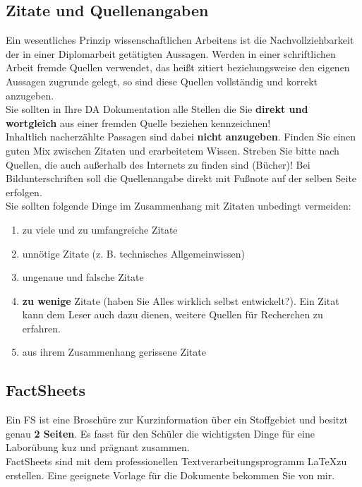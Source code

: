 \documentclass[a4paper, 12pt, xcolor=dvipsnames]{scrartcl}		%
\begin{document}
\subsection{Zitate und Quellenangaben}
Ein wesentliches Prinzip wissenschaftlichen Arbeitens ist die Nachvollziehbarkeit der in einer Diplomarbeit  getätigten Aussagen. Werden in einer schriftlichen Arbeit fremde Quellen verwendet, das heißt
zitiert beziehungsweise den eigenen Aussagen zugrunde gelegt, so sind diese Quellen vollständig und korrekt anzugeben.\\
Sie sollten in Ihre DA Dokumentation alle Stellen die Sie \textbf{direkt und wortgleich} aus einer fremden Quelle beziehen kennzeichnen!\\
Inhaltlich nacherzählte Passagen sind dabei \textbf{nicht anzugeben}. Finden Sie einen guten Mix zwischen Zitaten und erarbeitetem Wissen. Streben Sie bitte nach Quellen, die auch außerhalb des Internets zu finden sind (Bücher)!
Bei Bildunterschriften soll die Quellenangabe direkt mit Fußnote auf der selben Seite erfolgen.\\

Sie sollten folgende Dinge im Zusammenhang mit Zitaten unbedingt vermeiden:
\begin{enumerate}
\item zu viele und zu umfangreiche Zitate
\item unnötige Zitate (z. B. technisches Allgemeinwissen)
\item ungenaue und falsche Zitate
\item \textbf{zu wenige} Zitate (haben Sie Alles wirklich selbst entwickelt?). Ein Zitat kann dem Leser auch dazu dienen, weitere Quellen für  Recherchen zu erfahren.
\item aus ihrem Zusammenhang gerissene Zitate
\end{enumerate}
\vspace{-0.6cm}

\subsection{FactSheets}
Ein FS ist eine Broschüre zur Kurzinformation über ein Stoffgebiet und besitzt genau \textbf{2 Seiten}. Es fasst für den Schüler die wichtigsten Dinge für eine Laborübung kuz und prägnant zusammen.\\
FactSheets sind mit dem professionellen Textverarbeitungsprogramm \LaTeX zu erstellen. Eine geeignete Vorlage für die Dokumente bekommen Sie von mir.
\vspace{-0.6cm}
\end{document}
